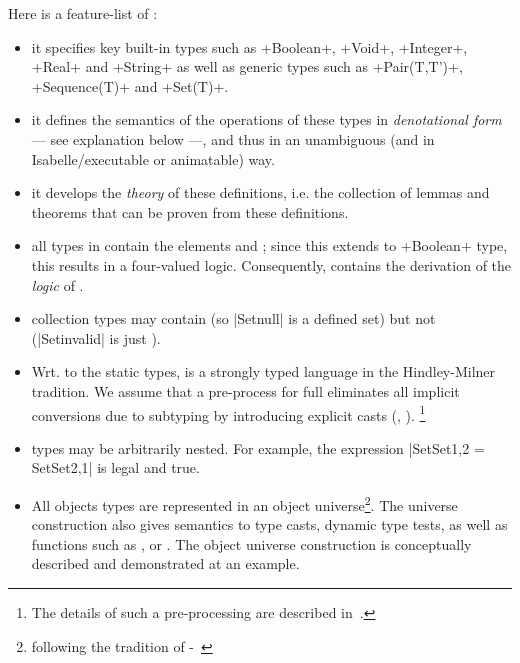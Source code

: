 Here is a feature-list of  \FOCL: 
\begin{itemize}
 \item it specifies key built-in types such as \inlineocl+Boolean+, 
         \inlineocl+Void+, \inlineocl+Integer+, \inlineocl+Real+ and \inlineocl+String+
         as well as generic types such as \inlineocl+Pair(T,T')+, \inlineocl+Sequence(T)+ and \inlineocl+Set(T)+.
 \item it defines the semantics of the operations of these types in \emph{denotational form} 
         --- see explanation below ---, 
         and thus in an unambiguous (and in Isabelle/\HOL executable or animatable) way.    
 \item it develops the \emph{theory} of these definitions, i.e. the collection of lemmas and theorems that
         can be proven from these definitions. 
 \item all types in  \FOCL contain the elements  and ;        
         since this extends to \inlineocl+Boolean+ type, this results 
         in a four-valued logic. Consequently,  \FOCL contains
         the derivation of the \emph{logic} of \OCL.
 \item collection types may contain
          (so \inlineocl|Set{null}| is a defined set) but not
          (\inlineocl|Set{invalid}| is just
         ).
 \item Wrt. to the static types,  \FOCL is a strongly typed language in 
         the Hindley-Milner tradition.
         We assume that a pre-process for full \OCL eliminates all implicit 
         conversions due to subtyping by introducing explicit casts (\eg,
         ). \footnote{The details of such a pre-processing are
         described in~\cite{brucker:interactive:2007}.}                                                                                      
 \item  \FOCL types may be arbitrarily nested. For example,
         the expression
         \inlineocl|Set{Set{1,2}} = Set{Set{2,1}}| is legal and true.
 \item All objects types are represented in an object universe\footnote{following
         the tradition of \HOL-\OCL~\cite{brucker.ea:extensible:2008-b}}.
         The universe construction also gives semantics to type casts, dynamic type
         tests, as well as functions such as ,
         or . The object universe construction is
         conceptually described and demonstrated at an example.

\end{itemize}
